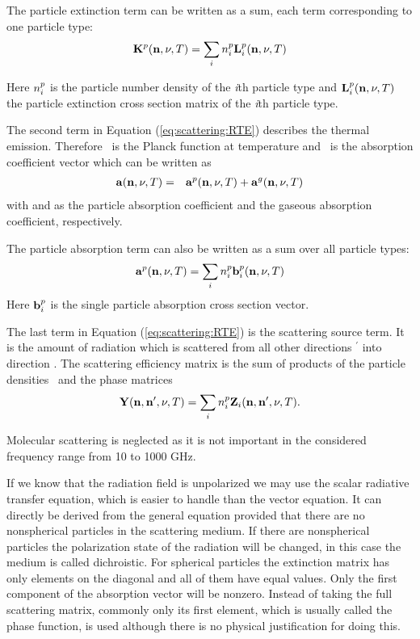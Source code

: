 The particle extinction term can be written as a sum, each term
corresponding to one particle type:
\begin{eqnarray}
  {\bf K}^{p}({\bf n}, \nu, T) = \sum_i n^p_i {\bf L}^{p}_i ({\bf n}, \nu, T)
\end{eqnarray}

Here $n^p_i$ is the particle number density of the
{\sl i}th particle type and  ${\bf L}^{p}_i({\bf n}, \nu, T)$  the particle
extinction cross section matrix of the
{\sl i}th particle type.

The second term in Equation (\ref{eq:scattering:RTE})  describes the thermal
emission. Therefore \Planck\  is the Planck
function at temperature \Tmp and \AbsVec\  is the absorption
coefficient vector which can be written as
 \begin{eqnarray}
  {\bf a} ({\bf n}, \nu, T)  &=& {\bf a}^{p} ({\bf n}, \nu, T) + {\bf a}^{g} ({\bf n}, \nu, T) 
  \end{eqnarray}
with  and  as the particle
absorption 
coefficient
and the gaseous absorption coefficient, respectively. 

The particle absorption term can also be written as a sum over all
particle types:
\begin{eqnarray}
  {\bf a}^{p}({\bf n}, \nu, T) = \sum_i n^p_i {\bf b}^{p}_i ({\bf n}, \nu, T)
\end{eqnarray}
Here ${\bf b}^{p}_i$ is the single particle absorption cross section
vector. 

The last term in Equation (\ref{eq:scattering:RTE}) is the scattering source
term. It is the 
amount of radiation which is scattered from all other directions \PDir$^\prime$   
into direction \PDir.  The scattering efficiency matrix
\SEfMat is the sum of products  
of the particle densities \PDen\  and the phase matrices \PhaMat
\begin{eqnarray}
{\bf Y}({\bf n}, {\bf n}', \nu, T) = \sum_i{n^p_i{\bf Z}_i({\bf n},
  {\bf n}', \nu, T)}.
\end{eqnarray}

Molecular scattering is neglected as it is not important in the 
considered frequency range from 10 to 1000 GHz. 

\label{sec:scattering:scalar_rte}

If we know that the radiation field is unpolarized we may use the scalar
radiative transfer equation, which is easier to handle than the vector
equation. It can directly be derived from the general equation
provided that there are no nonspherical particles in the scattering
medium. If there are nonspherical particles the polarization state of
the radiation will be changed, in this case the medium is called
dichroistic.
For spherical particles the extinction matrix has only elements on the
diagonal and all of them have equal values. Only the first component
of the absorption vector will be nonzero. Instead of taking the
full scattering 
matrix, commonly only its first element, which is usually called the
phase function, is used although there is no physical justification for
doing this.

